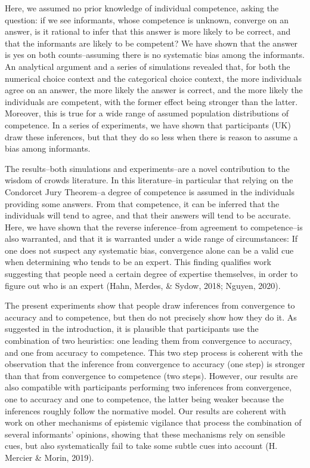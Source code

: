 \documentclass[
  doc,floatsintext]{apa6}
\begin{document}
Here, we assumed no prior knowledge of individual competence, asking the question: if we see informants, whose competence is unknown, converge on an answer, is it rational to infer that this answer is more likely to be correct, and that the informants are likely to be competent? We have shown that the answer is yes on both counts--assuming there is no systematic bias among the informants. An analytical argument and a series of simulations revealed that, for both the numerical choice context and the categorical choice context, the more individuals agree on an answer, the more likely the answer is correct, and the more likely the individuals are competent, with the former effect being stronger than the latter. Moreover, this is true for a wide range of assumed population distributions of competence. In a series of experiments, we have shown that participants (UK) draw these inferences, but that they do so less when there is reason to assume a bias among informants.

The results--both simulations and experiments--are a novel contribution to the wisdom of crowds literature. In this literature--in particular that relying on the Condorcet Jury Theorem--a degree of competence is assumed in the individuals providing some answers. From that competence, it can be inferred that the individuals will tend to agree, and that their answers will tend to be accurate. Here, we have shown that the reverse inference--from agreement to competence--is also warranted, and that it is warranted under a wide range of circumstances: If one does not suspect any systematic bias, convergence alone can be a valid cue when determining who tends to be an expert. This finding qualifies work suggesting that people need a certain degree of expertise themselves, in order to figure out who is an expert (Hahn, Merdes, \& Sydow, 2018; Nguyen, 2020).

The present experiments show that people draw inferences from convergence to accuracy and to competence, but then do not precisely show how they do it. As suggested in the introduction, it is plausible that participants use the combination of two heuristics: one leading them from convergence to accuracy, and one from accuracy to competence. This two step process is coherent with the observation that the inference from convergence to accuracy (one step) is stronger than that from convergence to competence (two steps). However, our results are also compatible with participants performing two inferences from convergence, one to accuracy and one to competence, the latter being weaker because the inferences roughly follow the normative model. Our results are coherent with work on other mechanisms of epistemic vigilance that process the combination of several informants' opinions, showing that these mechanisms rely on sensible cues, but also systematically fail to take some subtle cues into account (H. Mercier \& Morin, 2019).
\end{document}

